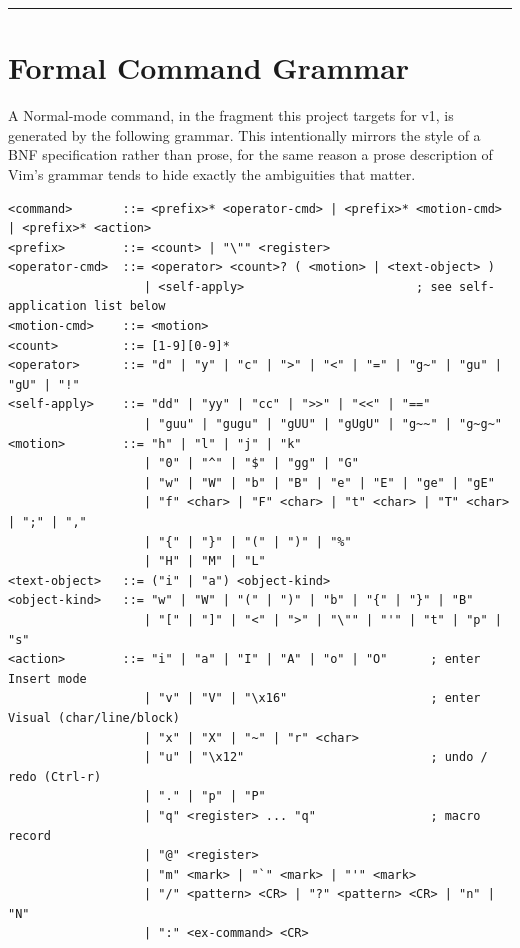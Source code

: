 \documentclass[11pt]{article}
\begin{document}
\begin{center}\rule{0.5\linewidth}{0.5pt}\end{center}

\hypertarget{sec-formal-command-grammar}{%
\section{Formal Command Grammar}\label{sec-formal-command-grammar}}

A Normal-mode command, in the fragment this project targets for v1, is
generated by the following grammar. This intentionally mirrors the style of
a BNF specification rather than prose, for the same reason a prose
description of Vim's grammar tends to hide exactly the ambiguities that
matter.

\begin{Verbatim}[breaklines=true, breakanywhere=true, fontsize=\small]
<command>       ::= <prefix>* <operator-cmd> | <prefix>* <motion-cmd> | <prefix>* <action>
<prefix>        ::= <count> | "\"" <register>
<operator-cmd>  ::= <operator> <count>? ( <motion> | <text-object> )
                   | <self-apply>                        ; see self-application list below
<motion-cmd>    ::= <motion>
<count>         ::= [1-9][0-9]*
<operator>      ::= "d" | "y" | "c" | ">" | "<" | "=" | "g~" | "gu" | "gU" | "!"
<self-apply>    ::= "dd" | "yy" | "cc" | ">>" | "<<" | "=="
                   | "guu" | "gugu" | "gUU" | "gUgU" | "g~~" | "g~g~"
<motion>        ::= "h" | "l" | "j" | "k"
                   | "0" | "^" | "$" | "gg" | "G"
                   | "w" | "W" | "b" | "B" | "e" | "E" | "ge" | "gE"
                   | "f" <char> | "F" <char> | "t" <char> | "T" <char> | ";" | ","
                   | "{" | "}" | "(" | ")" | "%"
                   | "H" | "M" | "L"
<text-object>   ::= ("i" | "a") <object-kind>
<object-kind>   ::= "w" | "W" | "(" | ")" | "b" | "{" | "}" | "B"
                   | "[" | "]" | "<" | ">" | "\"" | "'" | "t" | "p" | "s"
<action>        ::= "i" | "a" | "I" | "A" | "o" | "O"      ; enter Insert mode
                   | "v" | "V" | "\x16"                    ; enter Visual (char/line/block)
                   | "x" | "X" | "~" | "r" <char>
                   | "u" | "\x12"                          ; undo / redo (Ctrl-r)
                   | "." | "p" | "P"
                   | "q" <register> ... "q"                ; macro record
                   | "@" <register>
                   | "m" <mark> | "`" <mark> | "'" <mark>
                   | "/" <pattern> <CR> | "?" <pattern> <CR> | "n" | "N"
                   | ":" <ex-command> <CR>
\end{Verbatim}
\end{document}
